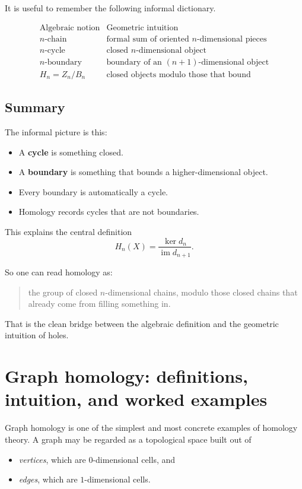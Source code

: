 \documentclass[12pt,a4paper]{article}
\theoremstyle{notespace}
\begin{document}
It is useful to remember the following informal dictionary.

\[
\begin{array}{c|c}
	\text{Algebraic notion} & \text{Geometric intuition} \\
	\hline
	n\text{-chain} & \text{formal sum of oriented }n\text{-dimensional pieces} \\
	n\text{-cycle} & \text{closed }n\text{-dimensional object} \\
	n\text{-boundary} & \text{boundary of an }(n+1)\text{-dimensional object} \\
	H_n=Z_n/B_n & \text{closed objects modulo those that bound}
\end{array}
\]

\subsection{ Summary}

The informal picture is this:

\begin{itemize}
	\item A \textbf{cycle} is something closed.
	\item A \textbf{boundary} is something that bounds a higher-dimensional object.
	\item Every boundary is automatically a cycle.
	\item Homology records cycles that are not boundaries.
\end{itemize}

This explains the central definition
\[
H_n(X)=\frac{\ker d_n}{\operatorname{im} d_{n+1}}.
\]

So one can read homology as:

\begin{quote}
	the group of closed \(n\)-dimensional chains, modulo those closed chains that already come from filling something in.
\end{quote}

That is the clean bridge between the algebraic definition and the geometric intuition of holes.




	
	\section{Graph homology: definitions, intuition, and worked examples}
	
	Graph homology is one of the simplest and most concrete examples of homology theory. A graph may be regarded as a topological space built out of
	\begin{itemize}[leftmargin=2em]
		\item \emph{vertices}, which are \(0\)-dimensional cells, and
		\item \emph{edges}, which are \(1\)-dimensional cells.
	\end{itemize}
	
\end{document}
